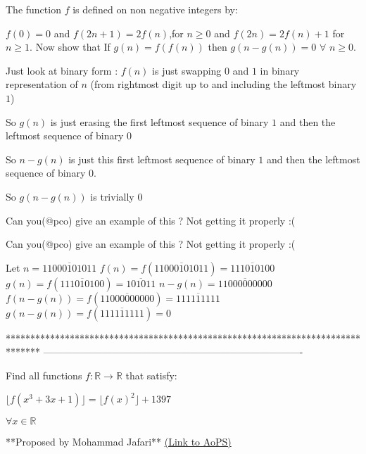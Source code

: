\begin{solution}
	\begin{tcolorbox}The function $f$ is defined on non negative integers by:
  
  $f(0)=0$ and $f(2n+1)=2f(n)$,for $n\geq 0$ and $f(2n)=2f(n)+1$ for $n{\geq} 1.$   
Now show that If $g(n)=f(f(n))$ then $g(n-g(n))=0$ $\forall$ $n{\geq}0.$\end{tcolorbox}

Just look at binary form :
$f(n)$ is just swapping $0$ and $1$ in binary representation of $n$ (from rightmost digit up to and including the leftmost binary $1$)

So $g(n)$ is just erasing the first leftmost sequence of binary $1$ and then the leftmost sequence of binary $0$

So $n-g(n)$ is just this first leftmost sequence of binary $1$ and then the leftmost sequence of binary $0$.

So $g(n-g(n))$ is trivially $0$

\end{solution}



\begin{solution}
	Can you(@pco) give an example of this ? Not getting it properly  :(
\end{solution}



\begin{solution}
	\begin{tcolorbox}Can you(@pco) give an example of this ? Not getting it properly  :(\end{tcolorbox}
Let $n=\overline{11000101011}$
$f(n)=f(\overline{11000101011})=\overline{111010100}$
$g(n)=f(\overline{111010100})=\overline{101011}$
$n-g(n)=\overline{11000000000}$
$f(n-g(n))=f(\overline{11000000000})=\overline{111111111}$
$g(n-g(n))=f(\overline{111111111})=0$

\end{solution}
*******************************************************************************
-------------------------------------------------------------------------------

\begin{problem}
	Find all functions $f:\mathbb{R} \to \mathbb{R}$ that satisfy:

$\lfloor{f(x^3+3x+1)} \rfloor =\lfloor{f(x)^2} \rfloor +1397$  

$\forall x \in \mathbb{R}$

**Proposed by Mohammad Jafari**
	\flushright \href{https://artofproblemsolving.com/community/c6h1611674}{(Link to AoPS)}
\end{problem}



